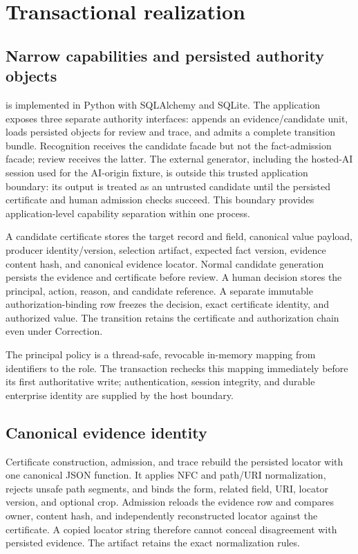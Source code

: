 \section{Transactional realization}
\label{sec:realization}

\subsection{Narrow capabilities and persisted authority objects}

\system{} is implemented in Python with SQLAlchemy and SQLite. The application exposes three separate authority interfaces:  appends an evidence/candidate unit,  loads persisted objects for review and trace, and  admits a complete transition bundle. Recognition receives the candidate facade but not the fact-admission facade; review receives the latter. The external generator, including the hosted-AI session used for the AI-origin fixture, is outside this trusted application boundary: its output is treated as an untrusted candidate until the persisted certificate and human admission checks succeed. This boundary provides application-level capability separation within one process.

A candidate certificate stores the target record and field, canonical value payload, producer identity/version, selection artifact, expected fact version, evidence content hash, and canonical evidence locator. Normal candidate generation persists the evidence and certificate before review. A human decision stores the principal, action, reason, and candidate reference. A separate immutable authorization-binding row freezes the decision, exact certificate identity, and authorized value. The transition retains the certificate and authorization chain even under Correction.

The principal policy is a thread-safe, revocable in-memory mapping from identifiers to the  role. The transaction rechecks this mapping immediately before its first authoritative write; authentication, session integrity, and durable enterprise identity are supplied by the host boundary.

\subsection{Canonical evidence identity}

Certificate construction, admission, and trace rebuild the persisted locator with one canonical JSON function. It applies NFC and path/URI normalization, rejects unsafe path segments, and binds the form, related field, URI, locator version, and optional crop. Admission reloads the evidence row and compares owner, content hash, and independently reconstructed locator against the certificate. A copied locator string therefore cannot conceal disagreement with persisted evidence. The artifact retains the exact normalization rules.

